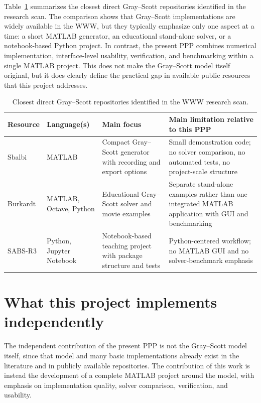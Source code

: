 Table~\ref{tab:closest_gray_scott_resources} summarizes the closest direct Gray--Scott repositories identified in the research scan. The comparison shows that Gray--Scott implementations are widely available in the WWW, but they typically emphasize only one aspect at a time: a short MATLAB generator, an educational stand-alone solver, or a notebook-based Python project. In contrast, the present PPP combines numerical implementation, interface-level usability, verification, and benchmarking within a single MATLAB project. This does not make the Gray--Scott model itself original, but it does clearly define the practical gap in available public resources that this project addresses.

\begin{table}[htbp]
\centering
\footnotesize
\setlength{\tabcolsep}{4pt}
\renewcommand{\arraystretch}{1.15}
\begin{tabularx}{\textwidth}{|>{\raggedright\arraybackslash}p{2.2cm}|>{\raggedright\arraybackslash}p{2.0cm}|>{\raggedright\arraybackslash}X|>{\raggedright\arraybackslash}X|}
\hline
\textbf{Resource} & \textbf{Language(s)} & \textbf{Main focus} & \textbf{Main limitation relative to this PPP} \\
\hline
Sbalbi \cite{sbalbi_gray_scott}
& MATLAB
& Compact Gray--Scott generator with recording and export options
& Small demonstration code; no solver comparison, no automated tests, no project-scale structure \\
\hline
Burkardt \cite{burkardt_gray_scott_pde,burkardt_gray_scott_movie}
& MATLAB, Octave, Python
& Educational Gray--Scott solver and movie examples
& Separate stand-alone examples rather than one integrated MATLAB application with GUI and benchmarking \\
\hline
SABS-R3 \cite{sabs_gray_scott}
& Python, Jupyter Notebook
& Notebook-based teaching project with package structure and tests
& Python-centered workflow; no MATLAB GUI and no solver-benchmark emphasis \\
\hline
\end{tabularx}
\caption{Closest direct Gray--Scott repositories identified in the WWW research scan.}
\label{tab:closest_gray_scott_resources}
\end{table}

\section{What this project implements independently}

The independent contribution of the present PPP is not the Gray--Scott model itself, since that model and many basic implementations already exist in the literature and in publicly available repositories. The contribution of this work is instead the development of a complete MATLAB project around the model, with emphasis on implementation quality, solver comparison, verification, and usability.

